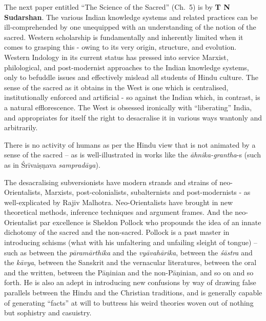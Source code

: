 The next paper entitled “The Science of the Sacred” (Ch.~5) is by \textbf{T N Sudarshan}. The various Indian knowledge systems and related practices can be ill-comprehended by one unequipped with an understanding of the notion of the sacred. Western scholarship is fundamentally and inherently limited when it comes to grasping this - owing to its very origin, structure, and evolution. Western Indology in its current status has pressed into service Marxist, philological, and post-modernist approaches to the Indian knowledge systems, only to befuddle issues and effectively mislead all students of Hindu culture. The sense of the sacred as it obtains in the West is one which is centralised, institutionally enforced and artificial - so against the Indian which, in contrast, is a natural efflorescence. The West is obsessed ironically with “liberating” India, and appropriates for itself the right to desacralise it in various ways wantonly and arbitrarily.

There is no activity of humans as per the Hindu view that is not animated by a sense of the sacred – as is well-illustrated in works like the \textit{āhnika-grantha}-s (such as in Śrīvaiṣṇava \textit{sampradāya}).

The desacralising subversionists have modern strands and strains of neo-Orientalists, Marxists, post-colonialists, subalternists and post-modernists - as well-explicated by Rajiv Malhotra. Neo-Orientalists have brought in new theoretical methods, inference techniques and argument frames. And the neo-Orientalist par excellence is Sheldon Pollock who propounds the idea of an innate dichotomy of the sacred and the non-sacred. Pollock is a past master in introducing schisms (what with his unfaltering and unfailing sleight of tongue) – such as between the \textit{pāramārthika} and the \textit{vyāvahārika}, between the \textit{śāstra} and the \textit{kāvya}, between the Sanskrit and the vernacular literatures, between the oral and the written, between the Pāṇinian and the non-Pāṇinian, and so on and so forth. He is also an adept in introducing new confusions by way of drawing false parallels between the Hindu and the Christian traditions, and is generally capable of generating “facts” at will to buttress his weird theories woven out of nothing but sophistry and casuistry.

